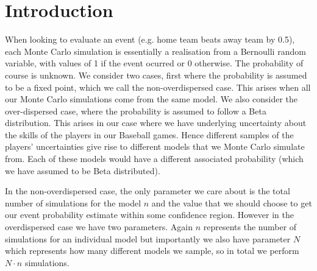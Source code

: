 \documentclass[
10pt, %
a4paper, %
oneside, %
headinclude,footinclude, %
BCOR5mm, %
]{scrartcl}
\begin{document}

\let\thefootnote\relax{}

\let\thefootnote\relax{}


\newpage %


\section{Introduction}

When looking to evaluate an event (e.g. home team beats away team by 0.5), each Monte Carlo simulation is essentially a realisation from a Bernoulli random variable, with values of 1 if the event ocurred or 0 otherwise. The probability of course is unknown. We consider two cases, first where the probability is assumed to be a fixed point, which we call the non-overdispersed case. This arises when all our Monte Carlo simulations come from the same model. We also consider the over-dispersed case, where the probability is assumed to follow a Beta distribution. This arises in our case where we have underlying uncertainty about the skills of the players in our Baseball games. Hence different samples of the players' uncertainties give rise to different models that we Monte Carlo simulate from. Each of these models would have a different associated probability (which we have assumed to be Beta distributed).

In the non-overdispersed case, the only parameter we care about is the total number of simulations for the model $n$ and the value that we should choose to get our event probability estimate within some confidence region. However in the overdispersed case we have two parameters. Again $n$ represents the number of simulations for an individual model but importantly we also have parameter $N$ which represents how many different models we sample, so in total we perform $N \cdot n$ simulations. 
\end{document}
